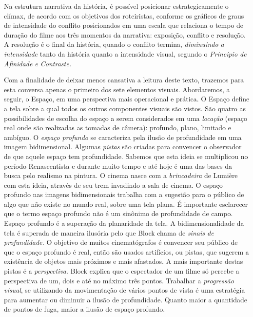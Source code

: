 Na estrutura narrativa da história, é possível posicionar
estrategicamente o clímax, de acordo com os objetivos dos roteiristas,
conforme os gráficos de graus de intensidade do conflito posicionados
em uma escala que relaciona o tempo de duração do filme aos três
momentos da narrativa: exposição, conflito e resolução. A resolução é o
final da história, quando o conflito termina, \emph{diminuindo a
	intensidade} tanto da história quanto a intensidade visual, segundo o
\emph{Princípio de Afinidade e Contraste.} \parencite{block2021visual}

Com a finalidade de deixar menos cansativa a leitura deste texto,
trazemos para esta conversa apenas o primeiro dos sete elementos
visuais. Abordaremos, a seguir, o Espaço, em uma perspectiva mais
operacional e prática. O Espaço define a tela sobre a qual todos os
outros componentes visuais são vistos. São quatro as possibilidades de
escolha do espaço a serem considerados em uma \emph{locação} (espaço
real onde são realizadas as tomadas de câmera): profundo, plano,
limitado e ambíguo. O \emph{espaço profundo} se caracteriza pela ilusão
de profundidade em uma imagem bidimensional. Algumas \emph{pistas} são
criadas para convencer o observador de que aquele espaço tem
profundidade. Sabemos que esta ideia se multiplicou no período
Renascentista e durante muito tempo e até hoje é uma das bases da busca
pelo realismo na pintura. O cinema nasce com a \emph{brincadeira} de
Lumière com esta ideia, através de seu trem invadindo a sala de cinema.
O espaço profundo nas imagens bidimensionais trabalha com a sugestão
para o público de algo que não existe no mundo real, sobre uma tela
plana. É importante esclarecer que o termo espaço profundo não é um
sinônimo de profundidade de campo. Espaço profundo é a superação da
planaridade da tela. A bidimensionalidade da tela é superada de maneira
ilusória pelo que Block chama de \emph{sinais de profundidade.} O
objetivo de muitos cinematógrafos é convencer seu público de que o
espaço profundo é real, então são usados artifícios, ou pistas, que
sugerem a existência de objetos mais próximos e mais afastados. A mais
importante destas pistas é a \emph{perspectiva}. Block explica que o
espectador de um filme só percebe a perspectiva de um, dois e até no
máximo três pontos. Trabalhar a \emph{progressão visual}, se utilizando
da movimentação de vários pontos de vista é uma estratégia para
aumentar ou diminuir a ilusão de profundidade. Quanto maior a
quantidade de pontos de fuga, maior a ilusão de espaço
profundo.

